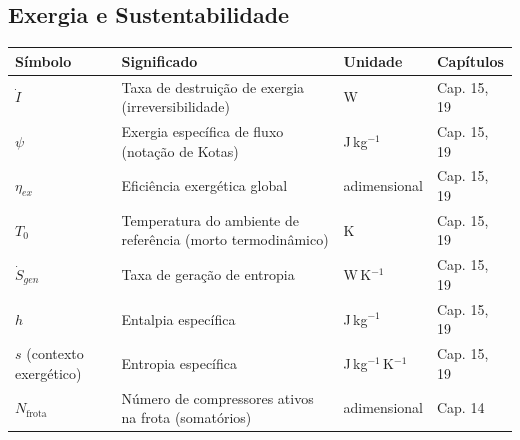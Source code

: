 \documentclass[12pt,a4paper]{article}
\numberwithin{equation}{section}
\numberwithin{table}{section}
\numberwithin{figure}{section}
\begin{document}
{\subsection*{Exergia e Sustentabilidade}
\begin{longtable}{|p{2.0cm}|p{6.1cm}|p{2.1cm}|p{4.2cm}|}
	\hline
	\textbf{Símbolo} & \textbf{Significado} & \textbf{Unidade} & \textbf{Capítulos} \\ \hline
	\endhead
	$\dot{I}$ & Taxa de destruição de exergia (irreversibilidade) & W & Cap. 15, 19 \\ \hline
	$\psi$\dag & Exergia específica de fluxo (notação de Kotas) & J\,kg$^{-1}$ & Cap. 15, 19 \\ \hline
	$\eta_{ex}$ & Eficiência exergética global & adimensional & Cap. 15, 19 \\ \hline
	$T_0$ & Temperatura do ambiente de referência (morto termodinâmico) & K & Cap. 15, 19 \\ \hline
	$\dot{S}_{gen}$ & Taxa de geração de entropia & W\,K$^{-1}$ & Cap. 15, 19 \\ \hline
	$h$ & Entalpia específica & J\,kg$^{-1}$ & Cap. 15, 19 \\ \hline
	$s$ (contexto exergético) & Entropia específica & J\,kg$^{-1}$\,K$^{-1}$ & Cap. 15, 19 \\ \hline
	$N_{\text{frota}}$\dag & Número de compressores ativos na frota (somatórios) & adimensional & Cap. 14 \\ \hline
\end{longtable}

}
\end{document}
